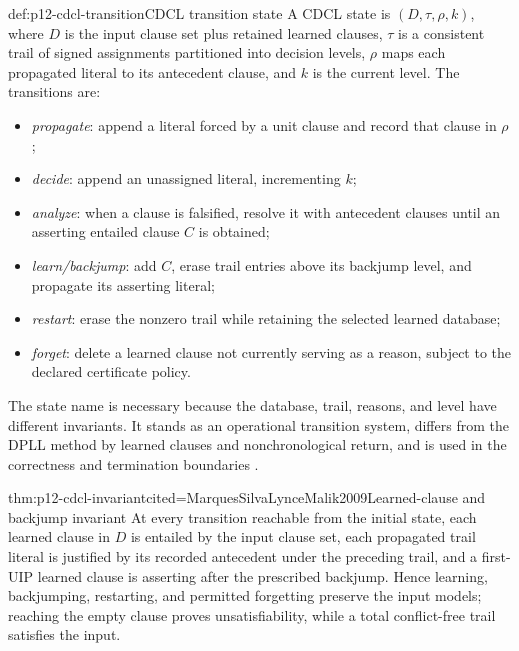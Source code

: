 \begin{hbdefinition}{def:p12-cdcl-transition}{CDCL transition state}
A CDCL state is \((D,\tau,\rho,k)\), where \(D\) is the input clause set plus
retained learned clauses, \(\tau\) is a consistent trail of signed assignments
partitioned into decision levels, \(\rho\) maps each propagated literal to its
antecedent clause, and \(k\) is the current level. The transitions are:
\begin{itemize}
  \item \emph{propagate}: append a literal forced by a unit clause and record
        that clause in \(\rho\);
  \item \emph{decide}: append an unassigned literal, incrementing \(k\);
  \item \emph{analyze}: when a clause is falsified, resolve it with antecedent
        clauses until an asserting entailed clause \(C\) is obtained;
  \item \emph{learn/backjump}: add \(C\), erase trail entries above its
        backjump level, and propagate its asserting literal;
  \item \emph{restart}: erase the nonzero trail while retaining the selected
        learned database;
  \item \emph{forget}: delete a learned clause not currently serving as a
        reason, subject to the declared certificate policy.
\end{itemize}
The state name is necessary because the database, trail, reasons, and level
have different invariants. It stands as an operational transition system,
differs from the DPLL method by learned clauses and nonchronological return,
and is used in the correctness and termination boundaries
\cite{MarquesSilvaSakallah1999,EenSorensson2003}.
\end{hbdefinition}

\begin{hbtheorem}{thm:p12-cdcl-invariant}{cited=MarquesSilvaLynceMalik2009}{Learned-clause and backjump invariant}
At every transition reachable from the initial state, each learned clause in
\(D\) is entailed by the input clause set, each propagated trail literal is
justified by its recorded antecedent under the preceding trail, and a
first-UIP learned clause is asserting after the prescribed backjump. Hence
learning, backjumping, restarting, and permitted forgetting preserve the input
models; reaching the empty clause proves unsatisfiability, while a total
conflict-free trail satisfies the input.
\end{hbtheorem}

